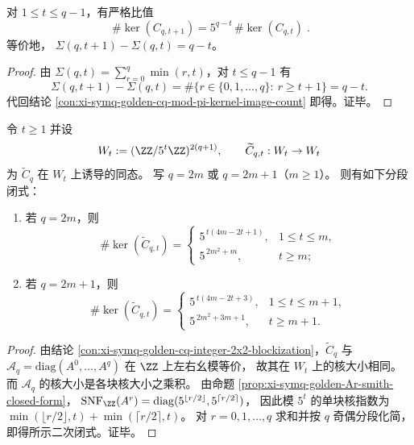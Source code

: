 \begin{corollary}\label{cor:xi-symq-golden-cq-pi-adic-kernel-growth}
对 \(1\le t\le q-1\)，有严格比值
\[
\boxed{\;
\#\ker(C_{q,t+1})=5^{q-t}\,\#\ker(C_{q,t})\; }.
\]
等价地，
\(
\Sigma(q,t+1)-\Sigma(q,t)=q-t
\)。
\end{corollary}
\begin{proof}
由 \(\Sigma(q,t)=\sum_{r=0}^{q}\min(r,t)\)，对 \(t\le q-1\) 有
\[
\Sigma(q,t+1)-\Sigma(q,t)
=\#\{r\in\{0,1,\dots,q\}:\ r\ge t+1\}
=q-t.
\]
代回结论 \ref{con:xi-symq-golden-cq-mod-pi-kernel-image-count} 即得。证毕。
\end{proof}

\begin{conclusion}\label{con:xi-symq-golden-cq-mod-5-kernel-size}
令 \(t\ge 1\) 并设
\[
W_t:=(\ZZ/5^{t}\ZZ)^{2(q+1)},
\qquad
\widetilde C_{q,t}:W_t\to W_t
\]
为 \(\widetilde C_q\) 在 \(W_t\) 上诱导的同态。
写 \(q=2m\) 或 \(q=2m+1\)（\(m\ge 1\)）。
则有如下分段闭式：
\begin{enumerate}
  \item 若 \(q=2m\)，则
  \[
  \#\ker(\widetilde C_{q,t})
  =
  \begin{cases}
  5^{\,t(4m-2t+1)},& 1\le t\le m,\\[4pt]
  5^{\,2m^{2}+m},& t\ge m;
  \end{cases}
  \]
  \item 若 \(q=2m+1\)，则
  \[
  \#\ker(\widetilde C_{q,t})
  =
  \begin{cases}
  5^{\,t(4m-2t+3)},& 1\le t\le m+1,\\[4pt]
  5^{\,2m^{2}+3m+1},& t\ge m+1.
  \end{cases}
  \]
\end{enumerate}
\end{conclusion}
\begin{proof}
由结论 \ref{con:xi-symq-golden-cq-integer-2x2-blockization}，\(\widetilde C_q\) 与 \(\mathcal A_q=\mathrm{diag}(A^0,\dots,A^q)\) 在 \(\ZZ\) 上左右幺模等价，
故其在 \(W_t\) 上的核大小相同。
而 \(\mathcal A_q\) 的核大小是各块核大小之乘积。
由命题 \ref{prop:xi-symq-golden-Ar-smith-closed-form}，
\(
\mathrm{SNF}_{\ZZ}(A^r)=\mathrm{diag}(5^{\lfloor r/2\rfloor},5^{\lceil r/2\rceil})
\)，
因此模 \(5^{t}\) 的单块核指数为
\(
\min(\lfloor r/2\rfloor,t)+\min(\lceil r/2\rceil,t)
\)。
对 \(r=0,1,\dots,q\) 求和并按 \(q\) 奇偶分段化简，即得所示二次闭式。证毕。
\end{proof}

